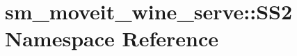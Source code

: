\hypertarget{namespacesm__moveit__wine__serve_1_1SS2}{}\section{sm\+\_\+moveit\+\_\+wine\+\_\+serve\+:\+:S\+S2 Namespace Reference}
\label{namespacesm__moveit__wine__serve_1_1SS2}
